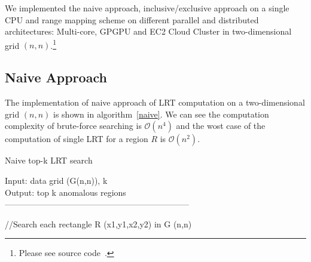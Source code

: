 \documentclass[AMA,LATO1COL]{WileyNJD-v2}
\newcommand\bigo{\mathcal O}
\begin{document}
We implemented the naive approach, inclusive/exclusive approach on a single CPU and range mapping scheme on different parallel and distributed architectures: Multi-core, GPGPU and EC2 Cloud Cluster in two-dimensional grid $(n,n)$.\footnote{Please see source code~\cite{lrtsrc}.}

\subsection{Naive Approach}
The implementation of naive approach of LRT computation on a two-dimensional grid $(n,n)$ is shown in algorithm~\ref{naive}. We can see the computation complexity of brute-force searching is $\bigo(n^4)$ and the wost case of the computation of single LRT for a region $R$ is $\bigo(n^2)$.

\begin{algorithm}[t!]
\label{algobr1}
\caption{Naive top-k LRT search}\label{naive}
Input: data grid (G(n,n)), k\\
Output: top k anomalous regions\\
------------------------------------------------------------------ \\
\begin{algorithmic}[1]
\State //Search each rectangle R (x1,y1,x2,y2) in G (n,n)
\EndFor
\EndFor
\EndFor
\EndFor
{}
\end{algorithmic}
\end{algorithm}
\end{document}

